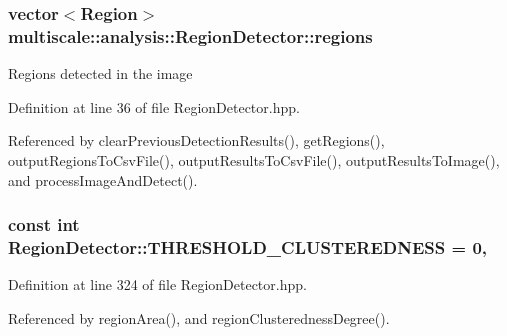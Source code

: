\hypertarget{classmultiscale_1_1analysis_1_1RegionDetector_aa6517ceb3a58295448d32e6e41499893}{
\subsubsection[{regions}]{\setlength{\rightskip}{0pt plus 5cm}vector$<${\bf Region}$>$ multiscale\-::analysis\-::\-Region\-Detector\-::regions\hspace{0.3cm}{\ttfamily [private]}}}\label{classmultiscale_1_1analysis_1_1RegionDetector_aa6517ceb3a58295448d32e6e41499893}
Regions detected in the image 

Definition at line 36 of file Region\-Detector.\-hpp.



Referenced by clear\-Previous\-Detection\-Results(), get\-Regions(), output\-Regions\-To\-Csv\-File(), output\-Results\-To\-Csv\-File(), output\-Results\-To\-Image(), and process\-Image\-And\-Detect().

\hypertarget{classmultiscale_1_1analysis_1_1RegionDetector_a52778f49510e1e500b2dc48857724e20}{
\subsubsection[{T\-H\-R\-E\-S\-H\-O\-L\-D\-\_\-\-C\-L\-U\-S\-T\-E\-R\-E\-D\-N\-E\-S\-S}]{\setlength{\rightskip}{0pt plus 5cm}const int Region\-Detector\-::\-T\-H\-R\-E\-S\-H\-O\-L\-D\-\_\-\-C\-L\-U\-S\-T\-E\-R\-E\-D\-N\-E\-S\-S = 0\hspace{0.3cm}{\ttfamily [static]}, {\ttfamily [private]}}}\label{classmultiscale_1_1analysis_1_1RegionDetector_a52778f49510e1e500b2dc48857724e20}


Definition at line 324 of file Region\-Detector.\-hpp.



Referenced by region\-Area(), and region\-Clusteredness\-Degree().

